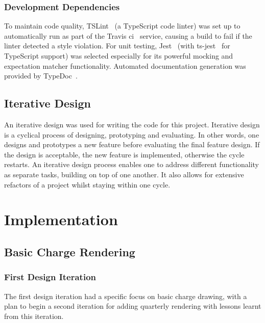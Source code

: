 \documentclass[nobib, a4paper, twoside, justified]{tufte-book}
\makeatletter
\newcommand{\charge}{\gls{charge}\@\xspace}
\makeatother
\begin{document}
\subsection{Development Dependencies}%
\label{sub:development_dependencies}

To maintain code quality, TSLint~\autocite{tslint} (a TypeScript code linter) was set up to
automatically run as part of the Travis \gls{ci}~\autocite{travis} service, causing a build to fail
if the linter detected a style violation. For unit testing, Jest~\autocite{jest} (with
ts-jest~\autocite{ts-jest} for TypeScript support) was selected especially for its powerful mocking
and expectation matcher functionality. Automated documentation generation was provided by
TypeDoc~\autocite{typedoc}.

\section{Iterative Design}%
\label{sec:iterative_design}

An iterative design was used for writing the code for this project. Iterative design is a cyclical
process of designing, prototyping and evaluating. In other words, one designs and prototypes a new
feature before evaluating the final feature design. If the design is acceptable, the new feature is
implemented, otherwise the cycle restarts. An iterative design process enables one to address
different functionality as separate tasks, building on top of one another. It also allows for
extensive refactors of a project whilst staying within one cycle.

\chapter{Implementation}%
\label{cha:implementation}

\section{Basic Charge Rendering}%
\label{sub:basic_charge_rendering}

\subsection{First Design Iteration}%
\label{sub:first_design_iteration}

The first design iteration had a specific focus on basic \charge drawing, with a plan to begin a
second iteration for adding quarterly rendering with lessons learnt from this iteration.
\end{document}
